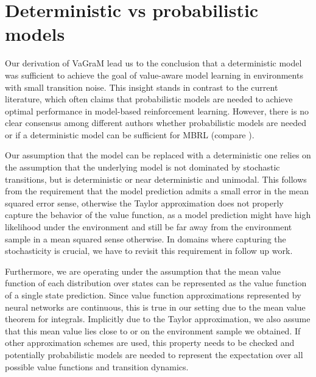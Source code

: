 \section{Deterministic vs probabilistic models}
\label{app:deterministic}

Our derivation of VaGraM lead us to the conclusion that a deterministic model was sufficient to achieve the goal of value-aware model learning in environments with small transition noise.
This insight stands in contrast to the current literature, which often claims that probabilistic models are needed to achieve optimal performance in model-based reinforcement learning.
However, there is no clear consensus among different authors whether probabilistic models are needed or if a deterministic model can be sufficient for MBRL (compare \textcite{lutter2021learning}).

Our assumption that the model can be replaced with a deterministic one relies on the assumption that the underlying model is not dominated by stochastic transitions, but is deterministic or near deterministic and unimodal. 
This follows from the requirement that the model prediction admits a small error in the mean squared error sense, otherwise the Taylor approximation does not properly capture the behavior of the value function, as a model prediction might have high likelihood under the environment and still be far away from the environment sample in a mean squared sense otherwise.
In domains where capturing the stochasticity is crucial, we have to revisit this requirement in follow up work.

Furthermore, we are operating under the assumption that the mean value function of each distribution over states can be represented as the value function of a single state prediction. 
Since value function approximations represented by neural networks are continuous, this is true in our setting due to the mean value theorem for integrals.
Implicitly due to the Taylor approximation, we also assume that this mean value lies close to or on the environment sample we obtained.
If other approximation schemes are used, this property needs to be checked and potentially probabilistic models are needed to represent the expectation over all possible value functions and transition dynamics.

